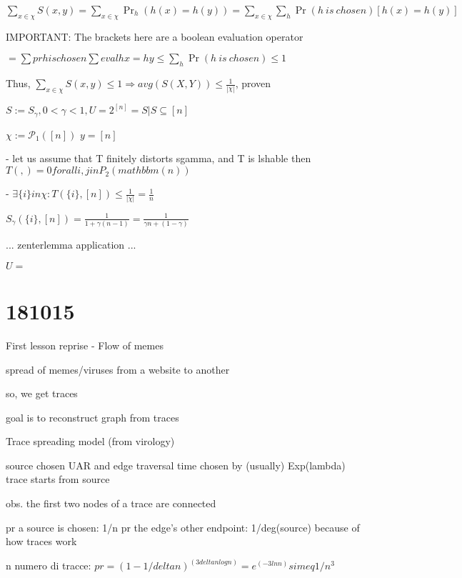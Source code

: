 \documentclass{report}
\begin{document}
	$\sum_{x \in \chi}S(x, y) = \sum_{x \in \chi}\Pr_h(h(x)=h(y)) = \sum_{x \in \chi}\sum_{h}\Pr(h\ is\ chosen)[h(x)=h(y)]$
	
	IMPORTANT: The brackets here are a boolean evaluation operator
	
	$= \sum pr h is chosen \sum eval hx = hy \leq \sum_h \Pr(h\ is\ chosen) \leq 1$
	
	Thus, $\sum_{x \in \chi}S(x, y) \leq 1 \Rightarrow avg(S(X, Y)) \leq \frac{1}{|\chi|}$, proven
	
	
	
	
	$S:= S_\gamma , 0 < \gamma < 1, U=2^{[n]}={S|S\subseteq [n]}$ %
	
	$\chi := \mathcal{P}_1([n])$
	$y = [n]$
	
	 - let us assume that T finitely distorts sgamma, and T is lshable
	then $T({},{}) = 0 forall {i, j} in P_2(mathbbm(n))$
	
	 - $\exists \{i\} in \chi : T(\{i\}, [n]) \leq \frac{1}{|\chi|} = \frac{1}{n}$
	 
	 $S_\gamma(\{i\}, [n]) = \frac{1}{1 + \gamma(n-1)} = \frac{1}{\gamma n + (1-\gamma)}$
	 
	 ...
	 zenterlemma application
	 ...
	
	
	
	$ U = {}$
	
	
	\chapter{181015}
	
	First lesson reprise - Flow of memes
	
	spread of memes/viruses from a website to another
	
	so, we get traces
	
	goal is to reconstruct graph from traces
	
	Trace spreading model (from virology)
	
	source chosen UAR and edge traversal time chosen by (usually) Exp(lambda)
	trace starts from source
	
	obs. the first two nodes of a trace are connected
	
	pr a source is chosen: 1/n
	pr the edge's other endpoint: 1/deg(source) because of how traces work
	
	n numero di tracce: $pr = (1-1/deltan)^(3deltanlogn) = e^(-3lnn) simeq 1/n^3$
	
\end{document}
